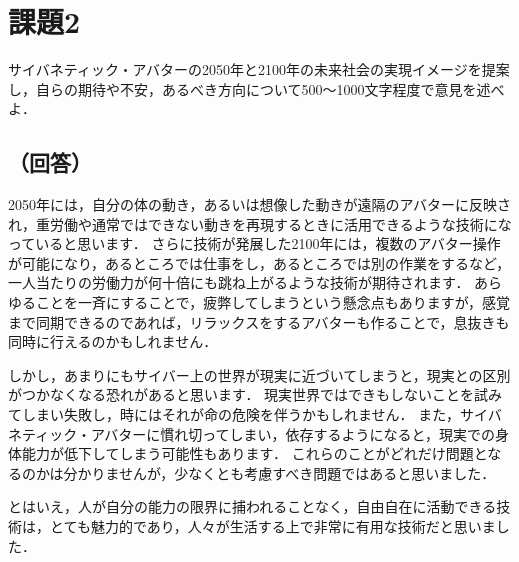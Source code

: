 \section*{課題2}
サイバネティック・アバターの2050年と2100年の未来社会の実現イメージを提案し，自らの期待や不安，あるべき方向について500～1000文字程度で意見を述べよ．

\subsection*{（回答）}
2050年には，自分の体の動き，あるいは想像した動きが遠隔のアバターに反映され，重労働や通常ではできない動きを再現するときに活用できるような技術になっていると思います．
さらに技術が発展した2100年には，複数のアバター操作が可能になり，あるところでは仕事をし，あるところでは別の作業をするなど，一人当たりの労働力が何十倍にも跳ね上がるような技術が期待されます．
あらゆることを一斉にすることで，疲弊してしまうという懸念点もありますが，感覚まで同期できるのであれば，リラックスをするアバターも作ることで，息抜きも同時に行えるのかもしれません．

しかし，あまりにもサイバー上の世界が現実に近づいてしまうと，現実との区別がつかなくなる恐れがあると思います．
現実世界ではできもしないことを試みてしまい失敗し，時にはそれが命の危険を伴うかもしれません．
また，サイバネティック・アバターに慣れ切ってしまい，依存するようになると，現実での身体能力が低下してしまう可能性もあります．
これらのことがどれだけ問題となるのかは分かりませんが，少なくとも考慮すべき問題ではあると思いました．

とはいえ，人が自分の能力の限界に捕われることなく，自由自在に活動できる技術は，とても魅力的であり，人々が生活する上で非常に有用な技術だと思いました．
